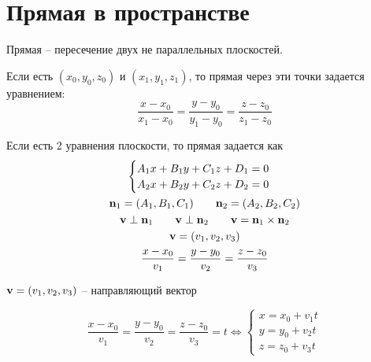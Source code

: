 \documentclass[main]{subfiles}
\begin{document}
\chapter{Прямая в пространстве}
\begin{definition}
    Прямая -- пересечение двух не параллельных плоскостей.
\end{definition}


\begin{definition}
    Если есть $(x_0, y_0, z_0)$ и $(x_1, y_1, z_1)$, то прямая через эти точки задается уравнением:
    \[\frac{x-x_0}{x_1-x_0} = \frac{y-y_0}{y_1-y_0} = \frac{z-z_0}{z_1-z_0}\]
\end{definition}

\begin{definition}
    Если есть 2 уравнения плоскости, то прямая задается как
    \begin{gather*}
        \begin{cases}
            A_1 x + B_1 y + C_1 z + D_1 = 0 \\
            A_2 x + B_2 y + C_2 z + D_2 = 0
        \end{cases}\\
        \mathbf{n}_1 = (A_1, B_1, C_1) \qquad \mathbf{n}_2 = (A_2, B_2, C_2)\\
        \mathbf{v} \perp \mathbf{n}_1 \qquad \mathbf{v} \perp \mathbf{n}_2 \qquad \mathbf{v} = \mathbf{n}_1 \times \mathbf{n}_2\\
        \mathbf{v} = (v_1, v_2, v_3)\\
        \frac{x-x_0}{v_1} = \frac{y-y_0}{v_2} = \frac{z-z_0}{v_3}
    \end{gather*}
\end{definition}

\begin{definition}
    $\mathbf{v} = (v_1, v_2, v_3)$ -- направляющий вектор
\end{definition}

\begin{definition}
    \[
        \frac{x-x_0}{v_1} = \frac{y-y_0}{v_2} = \frac{z-z_0}{v_3} = t \Leftrightarrow
        \begin{cases}
            x = x_0 + v_1 t \\
            y = y_0 + v_2 t \\
            z = z_0 + v_3 t
        \end{cases}
    \]
\end{definition}
\end{document}
